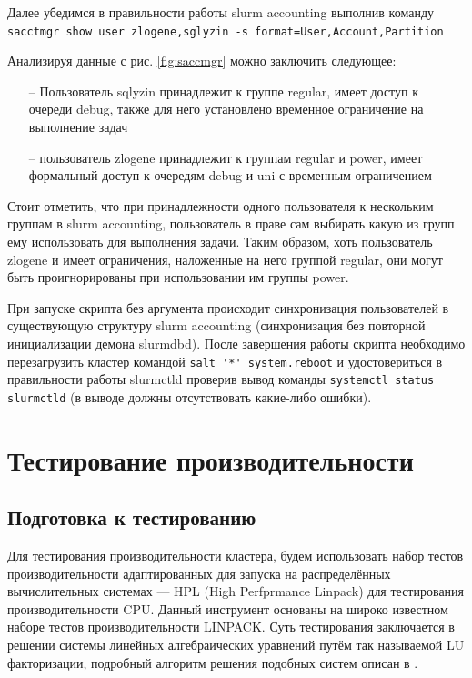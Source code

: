 \documentclass[a4paper]{extarticle}
\begin{document}
Далее убедимся в правильности работы slurm accounting выполнив команду  \\ \verb|sacctmgr show user zlogene,sglyzin -s format=User,Account,Partition|

\bigskip

Анализируя данные с рис. \ref{fig:saccmgr} можно заключить следующее:

\begin{itemize}
\item[--] Пользователь sqlyzin принадлежит к группе regular, имеет доступ к очереди debug, также для него установлено временное ограничение на выполнение задач
\item[--] пользователь zlogene принадлежит к группам regular и power, имеет формальный доступ к очередям debug и uni с временным ограничением
\end{itemize}

Стоит отметить, что при принадлежности одного пользователя к нескольким группам в slurm accounting, пользователь в праве сам выбирать какую из групп ему использовать для выполнения задачи. Таким образом, хоть пользователь zlogene и имеет ограничения, наложенные на него группой regular, они могут быть проигнорированы при использовании им группы power.

При запуске скрипта без аргумента происходит синхронизация пользователей в существующую структуру slurm accounting (синхронизация без повторной инициализации демона slurmdbd). После завершения работы скрипта необходимо перезагрузить кластер командой \verb|salt '*' system.reboot| и удостовериться в правильности работы slurmctld проверив вывод команды \verb|systemctl status slurmctld| (в выводе должны отсутствовать какие-либо ошибки).

\newpage

\section{Тестирование производительности}

\setcounter{figure}{0}

\subsection{Подготовка к тестированию}

Для тестирования производительности кластера, будем использовать набор тестов производительности адаптированных для запуска на распределённых вычислительных системах --- HPL (High Perfprmance Linpack) для тестирования производительности CPU. Данный инструмент основаны на широко известном наборе тестов производительности LINPACK. Суть тестирования заключается в решении системы линейных алгебраических уравнений путём так называемой LU факторизации, подробный алгоритм решения подобных систем описан в \cite{linpack}.
\end{document}
